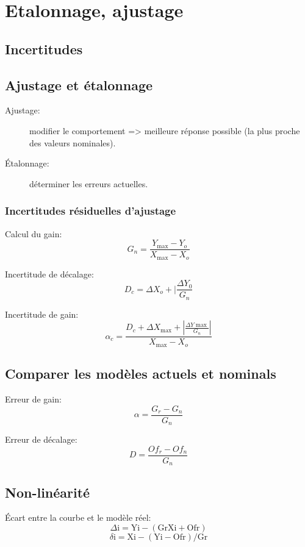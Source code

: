 \documentclass[10pt, twocolumn]{article}
\begin{document}
	\section*{Etalonnage, ajustage}
		\subsection*{Incertitudes}
		
		\subsection*{Ajustage et étalonnage}
			
			\begin{description}
				\item [Ajustage:] modifier le comportement => meilleure réponse possible (la plus proche des valeurs nominales).
				\item [Étalonnage:] déterminer les erreurs actuelles.
			\end{description}
			
			\subsubsection{Incertitudes résiduelles d'ajustage}
			
				Calcul du gain:
				\[G_{n}=\frac{Y_{\max }-Y_{o}}{X_{\max }-X_{o}}\]
				
				Incertitude de décalage:
				\[D_{c}=\Delta X_{o}+\mid \frac{\Delta Y_{0}}{G_{n}}\]
				
				Incertitude de gain:
				\[\alpha_{c}=\frac{D_{c}+\Delta X_{\max }+\left|\frac{\Delta Y \max }{G_{n}}\right|}{X_{\max }-X_{o}}\]
			
			\subsection{Comparer les modèles actuels et nominals}
			
				Erreur de gain:
				\[\alpha=\frac{G_{r}-G_{n}}{G_{n}}\]
				
				Erreur de décalage:
				\[D=\frac{O f_{r}-O f_{n}}{G_{n}}\]
			
			\subsection{Non-linéarité}
			
			Écart entre la courbe et le modèle réel:
			\[\Delta \mathrm{i}=\mathrm{Yi}-(\mathrm{GrXi}+\mathrm{Ofr})\]
			\[\delta \mathrm{i}=\mathrm{Xi}-(\mathrm{Yi}-\mathrm{Ofr}) / \mathrm{Gr}\]
			
\end{document}
